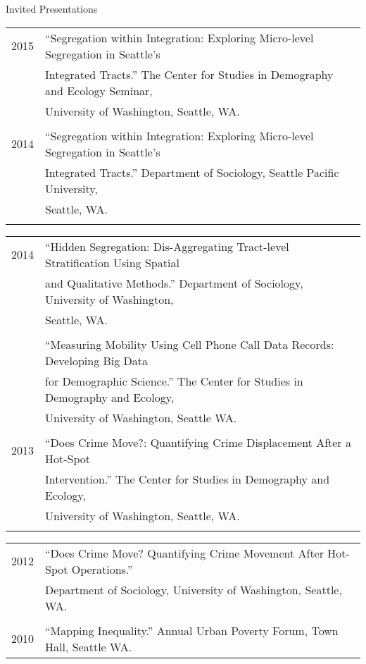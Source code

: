 \documentclass{resume} %
\begin{document}
\begin{rSection}{Invited Presentations}
\begin{tabular}{ @{} >{}l @{\hspace{6ex}} l }
2015	& ``Segregation within Integration: Exploring Micro-level Segregation in Seattle’s\\
		& Integrated Tracts.'' The Center for Studies in Demography and Ecology Seminar,\\
		& University of Washington, Seattle, WA.\\\\

2014	& ``Segregation within Integration: Exploring Micro-level Segregation in Seattle’s\\
		& Integrated Tracts.'' Department of Sociology, Seattle Pacific University, \\
		& Seattle, WA.\\\\
\end{tabular}

\begin{tabular}{ @{} >{}l @{\hspace{6ex}} l }
2014	& ``Hidden Segregation: Dis-Aggregating Tract-level Stratification Using Spatial\\
		& and Qualitative Methods.'' Department of Sociology, University of Washington, \\
		& Seattle, WA.\\\\

		& ``Measuring Mobility Using Cell Phone Call Data Records: Developing Big Data\\
		& for Demographic Science.'' The Center for Studies in Demography and Ecology, \\
		& University of Washington, Seattle WA.\\\\

2013	& ``Does Crime Move?: Quantifying Crime Displacement After a Hot-Spot\\
		& Intervention.'' The Center for Studies in Demography and Ecology, \\
		& University of Washington, Seattle, WA.\\\\
\end{tabular}

\begin{tabular}{ @{} >{}l @{\hspace{6ex}} l }
2012	& ``Does Crime Move? Quantifying Crime Movement After Hot-Spot Operations.''\\
		& Department of Sociology, University of Washington, Seattle, WA.\\\\

2010 	& ``Mapping Inequality.'' Annual Urban Poverty Forum, Town Hall, Seattle WA.
\end{tabular}
\vspace{5mm}
\end{rSection}
\end{document}
